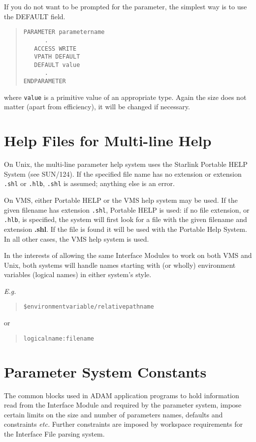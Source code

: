 \documentclass[twoside,11pt]{article}
\newcommand{\xref}[3]{#1}
\newcommand{\xlabel}[1]{}
\renewcommand{\_}{\texttt{\symbol{95}}}
\begin{document}
If you do not want to be prompted for the parameter, the simplest way is
to use the DEFAULT field.
\begin{quote} \begin{verbatim}
PARAMETER parametername
      .
   ACCESS WRITE
   VPATH DEFAULT
   DEFAULT value
      .
ENDPARAMETER
\end{verbatim} \end{quote}
where \texttt{value} is a primitive value of an appropriate type. Again the
size does not matter (apart from efficiency), it will be changed if
necessary.

\newpage
\section{Help Files for Multi-line Help
\xlabel{help_files_for_multiline_help}\label{help}}

On Unix, the multi-line parameter help system uses the Starlink Portable HELP
System (see \xref{SUN/124}{sun124}{}).
If the specified file name has no extension or extension
\texttt{.shl} or \texttt{.hlb}, \texttt{.shl} is assumed; anything else is an error.

On VMS, either Portable HELP or the VMS help system
may be used.
If the given filename has extension \texttt{.shl}, Portable HELP is used:
if no file extension, or \texttt{.hlb}, is specified,
the system will first look for a file with the given filename and extension
{\bf .shl}.
If the file is found it will be used with the Portable Help System.
In all other cases, the VMS help system is used.

In the interests of allowing the same Interface Modules to work on both VMS
and Unix, both systems will handle names starting with (or wholly) environment
variables (logical names) in either system's style.

{\em E.g.}
\begin{quote}
\texttt{\$environment\_variable/relative\_pathname}\/
\end{quote}
or
\begin{quote}
\texttt{logical\_name:filename}
\end{quote}

\newpage
\section{Parameter System Constants\xlabel{parameter_system_constants}
\label{consts}}

The common blocks used in ADAM application programs to hold information read
from the Interface Module and required by the parameter system, impose certain
limits on the size and number of parameters names, defaults and constraints
{\em etc.} Further constraints are imposed by workspace requirements for the
Interface File parsing system.
\end{document}
